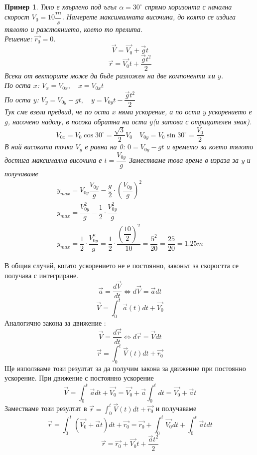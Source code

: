\documentclass[fleqn, 12pt]{article}
\newtheorem{example}{Пример}[subsection]
\begin{document}
\begin{example}
Тяло е хвърлено под ъгъл $\alpha = 30^\circ $ спрямо хоризонта с начална скорост 
$V_0 = 10 \dfrac{m}{s}$. Намерете максималната височина, до която се издига тялото и разстоянието, което то прелита. \\
Решение: $\vec{r_0} = 0$. \\
$$\vec{V} = \vec{V_0} + \vec{g}t$$
$$\vec{r} = \vec{V_0}t + \dfrac{\vec{g}t^2}{2}$$
Всеки от векторите може да бъде разложен на две компоненти $x$и $y$. \\
По оста $x$: $V_x = V_{0x}, \quad x = V_{0x}t$ \\
По оста $y$: $V_y = V_{0y} - gt, \quad y = V_{0y}t - \dfrac{\vec{g}t^2}{2}$ \\
Тук сме взели предвид, че по оста $x$ няма ускорение, а по оста $y$ ускорението е $g$, насочено надолу, в посока обратна на оста $y$(и затова с отрицателен знак). \\
$$V_{0x} = V_0 \cos{30^\circ} = \dfrac{\sqrt{3}}{2}V_0 \quad V_{0y} = V_0 \sin{30^\circ} = \dfrac{V_0}{2}$$
В най високата точка $V_y$ е равна на 0: $0 = V_{0y} - gt$ и времето за което тялото достига максимална височина е $t = \dfrac{V_{0y}}{g}$
Заместваме това време в израза за y и получаваме 
\begin{gather*}
y_{max} = V_{0y} \dfrac{V_{0y}}{g} - \dfrac{g}{2} \cdot \left(  \dfrac{V_{0y}}{g} \right)^2 \\
y_{max} = \dfrac{V_{0y}^2}{g} - \dfrac{1}{2} \cdot \dfrac{V_{0y}^2}{g}\\
y_{max} = \dfrac{1}{2} \cdot \dfrac{V_{0y}^2}{g} =  \dfrac{1}{2} \cdot \dfrac{\left( \dfrac{10}{2} \right)^2}{10} = \dfrac{5^2}{20} = \dfrac{25}{20} = 1.25m
\end{gather*}
\end{example}
В общия случай, когато ускорението не е постоянно, законът за скоростта се получава с интегриране. 
$$\vec{a} =  \dfrac{d\vec{V}}{dt} \Leftrightarrow d\vec{V} = \vec{a}dt$$
$$\vec{V} = \int _0 ^ t  \vec{a}(t)dt + \vec{V_0}$$
Аналогично закона за движение : 
$$\vec{V} =  \dfrac{d\vec{r}}{dt} \Leftrightarrow d\vec{r} = \vec{V}dt$$
$$\vec{r} = \int _0 ^ t  \vec{V}(t)dt + \vec{r_0}$$
Ще използваме този резултат за да получим закона за движение при постоянно ускорение. При движение с постоянно ускорение  
$$\vec{V} = \int _0 ^ t  \vec{a}dt + \vec{V_0} = \vec{V_0} + \vec{a} \int _0 ^ t dt = \vec{V_0} + \vec{a}t$$
Заместваме този резултат в $\vec{r} = \int _0 ^ t  \vec{V}(t)dt + \vec{r_0}$ и получаваме 
$$\vec{r} = \int _0 ^ t (\vec{V_0} + \vec{a}t) dt + \vec{r_0} = \vec{r_0} + \int _0 ^ t \vec{V_0} dt + \int _0 ^ t \vec{a}t dt$$
$$ \vec{r} = \vec{r_0} + \vec{V_0}t +\dfrac{\vec{a}t^2}{2} $$
\end{document}
